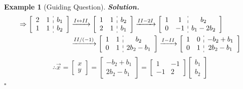 \documentclass[12pt, a4paper]{article}
\newtheorem{eg}{Example}[subsection]
\newenvironment*{sol}{\indent\textbf{Solution. }}{\hfill{$\square$}\par}
\def\vecx{\vec{x}}
\begin{document}
\begin{eg}[Guiding Question]
\begin{sol}
		\[\begin{aligned}\Rightarrow\left[\begin{array}{c:c}\begin{matrix}2&1\\1&1\end{matrix}&\begin{matrix}b_1\\b_2\end{matrix}\end{array}\right]&\xrightarrow[]{I\leftrightarrow II}\left[\begin{array}{c:c}\begin{matrix}1&1\\2&1\end{matrix}&\begin{matrix}b_2\\b_1\end{matrix}\end{array}\right]\xrightarrow[]{II-2I}\left[\begin{array}{c:c}\begin{matrix}1&1\\0&-1\end{matrix}&\begin{matrix}b_2\\b_1-2b_2\end{matrix}\end{array}\right]\\&\xrightarrow[]{II/(-1)}\left[\begin{array}{c:c}\begin{matrix}1&1\\0&1\end{matrix}&\begin{matrix}b_2\\2b_2-b_1\end{matrix}\end{array}\right]\xrightarrow[]{I-II}\left[\begin{array}{c:c}\begin{matrix}1&0\\0&1\end{matrix}&\begin{matrix}-b_2+b_1\\2b_2-b_1\end{matrix}\end{array}\right]\end{aligned}\]
		\[\therefore\vecx=\begin{bmatrix}x\\y\end{bmatrix}=\begin{bmatrix}-b_2+b_1\\2b_2-b_1\end{bmatrix}=\begin{bmatrix}1&-1\\-1&2\end{bmatrix}\begin{bmatrix}b_1\\b_2\end{bmatrix}\]
	\end{sol}
\end{eg}
\end{document}
